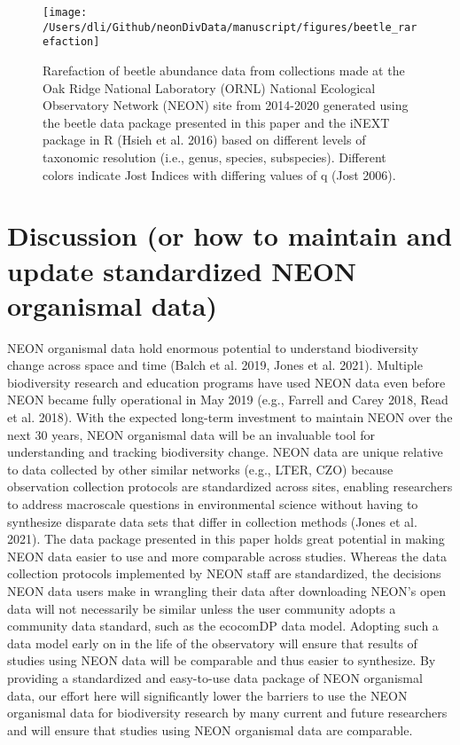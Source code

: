 \documentclass[
  12pt,
]{article}
\begin{document}
\begin{figure}

{\centering \texttt{[image: /Users/dli/Github/neonDivData/manuscript/figures/beetle\_rarefaction]} 

}

\caption{Rarefaction of beetle abundance data from collections made at the Oak Ridge National Laboratory (ORNL) National Ecological Observatory Network (NEON) site from 2014-2020 generated using the beetle data package presented in this paper and the iNEXT package in R (Hsieh et al. 2016) based on different levels of taxonomic resolution (i.e., genus, species, subspecies). Different colors indicate Jost Indices with differing values of q (Jost 2006).}\label{fig:Fig3Curve}
\end{figure}

\hypertarget{discussion-or-how-to-maintain-and-update-standardized-neon-organismal-data}{%
\section{Discussion (or how to maintain and update standardized NEON organismal data)}\label{discussion-or-how-to-maintain-and-update-standardized-neon-organismal-data}}

NEON organismal data hold enormous potential to understand biodiversity change across space and time (Balch et al. 2019, Jones et al. 2021). Multiple biodiversity research and education programs have used NEON data even before NEON became fully operational in May 2019 (e.g., Farrell and Carey 2018, Read et al. 2018). With the expected long-term investment to maintain NEON over the next 30 years, NEON organismal data will be an invaluable tool for understanding and tracking biodiversity change. NEON data are unique relative to data collected by other similar networks (e.g., LTER, CZO) because observation collection protocols are standardized across sites, enabling researchers to address macroscale questions in environmental science without having to synthesize disparate data sets that differ in collection methods (Jones et al. 2021). The data package presented in this paper holds great potential in making NEON data easier to use and more comparable across studies. Whereas the data collection protocols implemented by NEON staff are standardized, the decisions NEON data users make in wrangling their data after downloading NEON's open data will not necessarily be similar unless the user community adopts a community data standard, such as the ecocomDP data model. Adopting such a data model early on in the life of the observatory will ensure that results of studies using NEON data will be comparable and thus easier to synthesize. By providing a standardized and easy-to-use data package of NEON organismal data, our effort here will significantly lower the barriers to use the NEON organismal data for biodiversity research by many current and future researchers and will ensure that studies using NEON organismal data are comparable.
\end{document}
